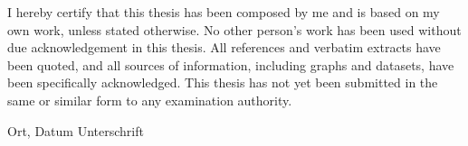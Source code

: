 
I hereby certify that this thesis has been composed by me and is based on my own work, unless stated otherwise. 
No other person’s work has been used without due acknowledgement in this thesis. 
All references and verbatim extracts have been quoted, and all sources of information, including graphs and datasets, have been specifically acknowledged.
This thesis has not yet been submitted in the same or similar form to any examination authority.

\vspace{3cm}
Ort, Datum \hspace{5cm} Unterschrift\\
\newpage\null\thispagestyle{empty}\newpage


